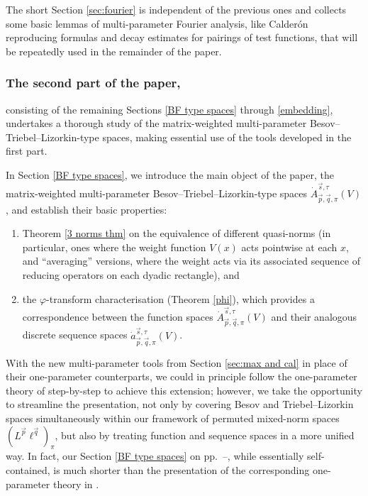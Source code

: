 \documentclass[11pt, reqno]{amsart}
\theoremstyle{definition}
\theoremstyle{remark}
\numberwithin{equation}{section}
\newcommand{\vp}{\vec p}
\newcommand{\vq}{\vec q}
\newcommand{\vs}{\vec s}
\newcommand{\Atau}{\dot A^{\vs,\tau}_{\vp,\vq,\pi}}
\newcommand{\atau}{\dot a^{\vs,\tau}_{\vp,\vq,\pi}}
\begin{document}
The short Section \ref{sec:fourier} is independent of the previous ones and collects some basic lemmas of multi-parameter Fourier analysis, like Calder\'on reproducing formulas and decay estimates for pairings of test functions, that will be repeatedly used in the remainder of the paper.


\subsubsection*{The second part of the paper,} consisting of the remaining Sections \ref{BF type spaces} through \ref{embedding}, undertakes a thorough study of the matrix-weighted multi-parameter Besov--Triebel--Lizorkin-type spaces, making essential use of the tools developed in the first part.

In Section \ref{BF type spaces}, we introduce the main object of the paper, the matrix-weighted multi-parameter Besov--Triebel--Lizorkin-type spaces $\Atau(V)$, and establish their basic properties:
\begin{enumerate}[\rm(i)]
  \item Theorem \ref{3 norms thm} on the equivalence of different quasi-norms (in particular, ones where the weight function $V(x)$ acts pointwise at each $x$, and ``averaging'' versions, where the weight acts via its associated sequence of reducing operators on each dyadic rectangle), and
  \item the $\varphi$-transform characterisation (Theorem \ref{phi}), which provides a correspondence between the function spaces $\Atau(V)$ and their analogous discrete sequence spaces $\atau(V)$.
\end{enumerate}
With the new multi-parameter tools from Section \ref{sec:max and cal} in place of their one-parameter counterparts, we could in principle follow the one-parameter theory of \cite{BHYY:1a} step-by-step to achieve this extension; however, we take the opportunity to streamline the presentation, not only by covering Besov and Triebel--Lizorkin spaces simultaneously within our framework of permuted mixed-norm spaces $(L^{\vp}\ell^{\vq})_\pi$, but also by treating function and sequence spaces in a more unified way. In fact, our Section \ref{BF type spaces} on pp.\ \pageref{BF type spaces}--\pageref{sec AD}, while essentially self-contained, is much shorter than the presentation of the corresponding one-parameter theory in \cite[Section 3, pp.\ 6140--6167]{BHYY:1a}.
\end{document}
